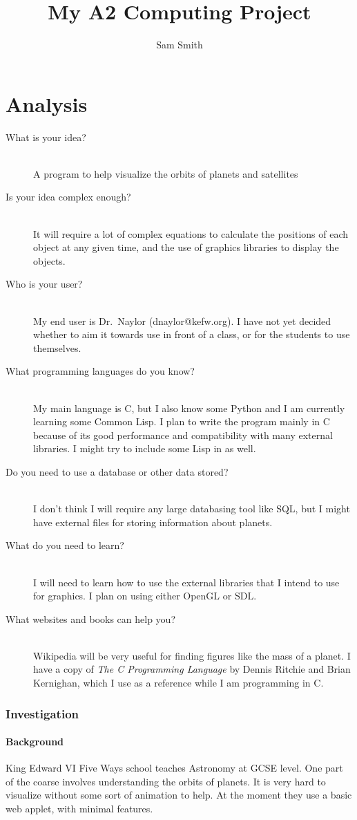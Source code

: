 \documentclass[a4paper,11pt,titlepage]{article}
\author{Sam Smith}
\title{My A2 Computing Project}
\begin{document}
\maketitle

\part{Analysis}

\begin{description}
	\item[What is your idea?] \hfill \\
		A program to help visualize the orbits of planets and satellites
	\item[Is your idea complex enough?] \hfill \\
		It will require a lot of complex equations to calculate the
		positions of each object at any given time, and the use of
		graphics libraries to display the objects.
	\item[Who is your user?] \hfill \\
		My end user is Dr.~Naylor (dnaylor@kefw.org). I have not yet
		decided whether to aim it towards use in front of a class, or
		for the students to use themselves.
	\item[What programming languages do you know?] \hfill \\
		My main language is C, but I also know some Python and I am
		currently learning some Common Lisp. I plan to write the program
		mainly in C because of its good performance and compatibility
		with many external libraries. I might try to include some Lisp
		in as well.
	\item[Do you need to use a database or other data stored?] \hfill \\
		I don't think I will require any large databasing tool like SQL,
		but I might have external files for storing information about
		planets.
	\item[What do you need to learn?] \hfill \\
		I will need to learn how to use the external libraries that I
		intend to use for graphics. I plan on using either OpenGL or
		SDL.
	\item[What websites and books can help you?] \hfill \\
		Wikipedia will be very useful for finding figures like the mass
		of a planet. I have a copy of \emph{The C Programming Language}
		by Dennis Ritchie and Brian Kernighan, which I use as a
		reference while I am programming in C.
		\\
\end{description}

\section{Investigation}
\subsection{Background}

King Edward VI Five Ways school teaches Astronomy at GCSE level. One part of the
coarse involves understanding the orbits of planets. It is very hard to
visualize without some sort of animation to help. At the moment they use a basic
web applet, with minimal features.
\end{document}
